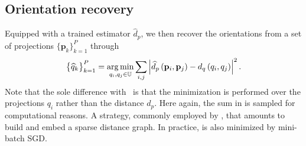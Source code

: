 
\subsection{Orientation recovery}\label{sec:method:orientation-recovery}

Equipped with a trained estimator $\widehat{d}_p$, we then recover the orientations from a set of projections $\big\{ \mathbf{p}_k \big\}_{k=1}^P$ through
\begin{equation}
    \big\{ \widehat{q}_k \big\}_{k=1}^P = \operatorname*{arg\,min}_{q_i, q_j \in \mathbb{U}} \sum_{i,j} \left| \widehat{d}_p \left( \mathbf{p}_i, \mathbf{p}_j \right) - d_q\left(q_i,q_j\right) \right|^2.
    \label{eqn:orientation-recovery}
\end{equation}
Note that the sole difference with~ is that the minimization is performed over the projections $q_i$ rather than the distance $d_p$. Here again, the sum in  is sampled for computational reasons.
A strategy, commonly employed by , that amounts to build and embed a sparse distance graph. 
In practice,  is also minimized by mini-batch SGD.
